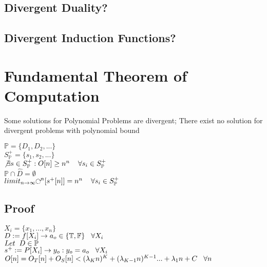 \documentclass[11pt]{article}
\def \nestedloop {\ensuremath{\rotatebox[origin=c]{-90}{$\circlearrowright$}}^n}
\begin{document}
\subsection{Divergent Duality?}
\subsection{Divergent Induction Functions?}









\newpage
\section{Fundamental Theorem of Computation}
Some solutions for Polynomial Problems are divergent; There exist no solution for divergent problems with polynomial bound
\begin{center}
$
\mathbb{P} = \{D_1,D_2,...\}
$
\\ \vspace{2mm}
$
S^+_{\mathbb{P}} = \{s_1,s_2,...\}
$
\\ \vspace{2mm}
$
\not \exists s \in S^+_{\mathbb{P}} : O[n] \geq n^n \hspace{4mm} \forall s_i \in S^+_{\mathbb{P}} 
$
\\ \vspace{2mm}
$
\mathbb{P} \cap \hat{D} = \emptyset
$
\\ \vspace{6mm}
$
limit_{n \rightarrow \infty} \nestedloop [s^+[n]] = n^n  \hspace{4mm} \forall s_i \in S^+_{\mathbb{P}} 
$
\end{center}

\subsection{Proof}
\begin{center}
$
X_i = \{x_1,...,x_n\}
$
\\ \vspace{2mm}
$
D := f \lbrack X_i \rbrack \rightarrow a_{o} \in \{\mathbb{T}, \mathbb{F}\} \hspace{3mm} \forall X_i
$
\\ \vspace{6mm}
$
Let \hspace{2mm} D \in \mathbb{P}
$
\\ \vspace{2mm}
$
s^+ := P \lbrack X_i \rbrack \rightarrow y_{o} : y_o = a_{o} \hspace{3mm} \forall X_i
$
\\ \vspace{2mm}
$
O[n] = O_T[n] + O_S[n] < (\lambda_K n)^K + (\lambda_{K-1} n)^{K-1}... + \lambda_1 n + C \hspace{3mm} \forall n
$
\end{center}
\end{document}
